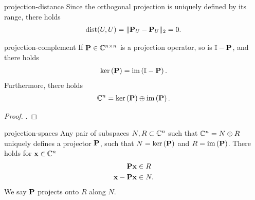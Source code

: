 \begin{Example}{projection-distance}
  Since the orthogonal projection is uniquely defined by its range, there holds
  \begin{gather}
    \operatorname{dist}(U,U) = \lVert\mathbf P_U-\mathbf P_U\rVert_2 = 0.
  \end{gather}
\end{Example}



\begin{Lemma}{projection-complement}
  If $\mathbf P\in\mathbb C^{n\times n}$ is a projection operator, so is
  $\mathbb I-\mathbf P$, and there holds
  \begin{gather}
    \operatorname{ker}\left(\mathbf P\right) = \operatorname{im}\left(\mathbb I-\mathbf P\right).
  \end{gather}
  Furthermore, there holds
  \begin{gather}
    \mathbb C^n = \operatorname{ker}\left(\mathbf P\right) \oplus \operatorname{im}\left(\mathbf P\right).
  \end{gather}
\end{Lemma}

\begin{proof}
  \cite[Section 1.12.1]{Saad00}.
\end{proof}

\begin{Lemma}{projection-spaces}
  Any pair of subspaces $N,R\subset \mathbb C^n$ such that $\mathbb C^n = N\oplus R$
  uniquely defines a projector $\mathbf P$, such that $N = \operatorname{ker}\left(\mathbf P\right)$ and
  $R=\operatorname{im}\left(\mathbf P\right)$. There holds for $\mathbf x\in\mathbb C^n$
  \begin{align}
    \mathbf P \mathbf x &\in R\\
    \mathbf x - \mathbf P \mathbf x &\in N.
  \end{align}
  We say $\mathbf P$ projects onto $R$ along $N$.
\end{Lemma}


